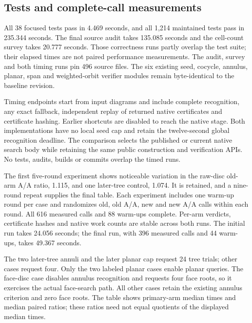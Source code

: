 \subsection{Tests and complete-call measurements}

All 38 focused tests pass in 4.469 seconds, and all 1,214 maintained tests
pass in 235.344 seconds. The final source audit takes 135.085 seconds and
the cell-count survey takes 20.777 seconds. Those correctness runs partly
overlap the test suite; their elapsed times are not paired performance
measurements. The audit, survey and both timing runs pin 496 source files.
The six existing seed, cocycle, annulus, planar, span and weighted-orbit
verifier modules remain byte-identical to the baseline revision.

Timing endpoints start from input diagrams and include complete
recognition, any exact fallback, independent replay of returned native
certificates and certificate hashing. Earlier shortcuts are disabled to
reach the native stage. Both implementations have no local seed cap and
retain the twelve-second global recognition deadline. The comparison
selects the published or current native search body while retaining the
same public construction and verification APIs. No tests, audits, builds
or commits overlap the timed runs.

The first five-round experiment shows noticeable variation in the raw-disc
old-arm A/A ratio, 1.115, and one later-tree control, 1.074. It is retained,
and a nine-round repeat supplies the final table. Each experiment includes
one warm-up round per case and randomizes old, old A/A, new and new A/A
calls within each round. All 616 measured calls and 88 warm-ups complete.
Per-arm verdicts, certificate hashes and native work counts are stable
across both runs. The initial run takes 24.056 seconds; the final run,
with 396 measured calls and 44 warm-ups, takes 49.367 seconds.

The two later-tree annuli and the later planar cap request 24 tree trials;
other cases request four. Only the two labeled planar cases enable planar
queries. The face-disc case disables annulus recognition and requests four
face roots, so it exercises the actual face-search path. All other cases
retain the existing annulus criterion and zero face roots. The table shows
primary-arm median times and median paired ratios; these ratios need not
equal quotients of the displayed median times.

\begin{center}
\small
\end{center}

